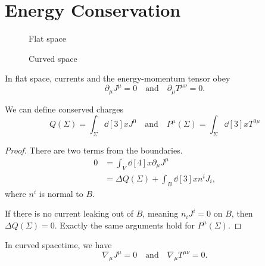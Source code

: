 
\section{Energy Conservation}%
\label{sec:energy_conservation}

\begin{figure}[tbhp]
  \begin{minipage}[t]{0.5\columnwidth}
    \centering
    \def\svgwidth{0.73\columnwidth}
    
    \caption{Flat space}
    \label{fig:l19f1}
  \end{minipage}%
  \begin{minipage}[t]{0.5\columnwidth}
    \centering
    \def\svgwidth{0.8\columnwidth}
    
    \caption{Curved space}
    \label{fig:l19f2}
  \end{minipage}
\end{figure}

In flat space, currents and the energy-momentum tensor obey
\begin{equation}
  \partial_{\mu} J^{\mu} = 0 \quad \text{and} \quad  \partial_{\mu} T^{\mu\nu} = 0.
\end{equation}
\begin{claim}
  We can define conserved charges
  \begin{equation}
    Q(\Sigma) = \int_{\Sigma} \dd[3]{x} J^0 \quad \text{and} \quad P^{\mu}(\Sigma) = \int_{\Sigma} \dd[3]{x} T^{0\mu}
  \end{equation}
\end{claim}
\begin{proof}
  There are two terms from the boundaries.
  \begin{align}
    0 &= \int_V \dd[4]{x} \partial_{\mu} J^{\mu} \\
      &= \Delta Q(\Sigma) + \int_B \dd[3]{x} n^{i} J_{i},
  \end{align}
  where $n^{i}$ is normal to $B$.

  If there is no current leaking out of $B$, meaning $n_{i}J^{i} = 0$ on $B$, then $\Delta Q(\Sigma) = 0$. Exactly the same arguments hold for $P^{\mu}(\Sigma)$.
\end{proof}

In curved spacetime, we have
\begin{equation}
  \nabla_{\mu} J^{\mu} = 0 \quad \text{and} \quad \nabla_{\mu} T^{\mu\nu} = 0.
\end{equation}

